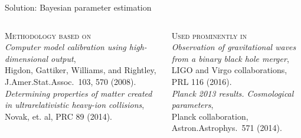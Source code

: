 \documentclass{beamer}
\begin{document}
\begin{frame}{Solution: Bayesian parameter estimation}
  \bigskip
  \begin{columns}[t]
    \begin{column}{.5\textwidth}
      {\scshape \color{theme} Methodology based on}\\[1ex]
      \scriptsize
      \emph{Computer model calibration using high-dimensional output},\\[.5ex]
      Higdon, Gattiker, Williams, and Rightley,\\ J.Amer.Stat.Assoc.\ 103, 570 (2008).\\[2ex]
      \emph{Determining properties of matter created in ultrarelativistic heavy-ion collisions},\\[.5ex]
      Novak, et. al, PRC 89 (2014).
    \end{column}
    \begin{column}{.5\textwidth}
      {\scshape \color{theme} Used prominently in}\\[1ex]
      \scriptsize
      \emph{Observation of gravitational waves from a binary black hole merger},\\[.5ex]
      LIGO and Virgo collaborations,\\PRL 116 (2016).\\[2ex]
      \emph{Planck 2013 results. Cosmological parameters},\\[.5ex]
      Planck collaboration, Astron.Astrophys.\ 571 (2014).
    \end{column}
  \end{columns}
\end{frame}



\newcommand{\boxtitle}[1]{\textbf{#1}\\[.5ex]}
\end{document}
